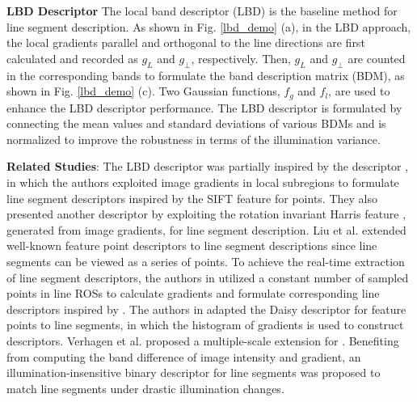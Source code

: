\documentclass[journal,compsoc]{IEEEtran}
\begin{document}
\textbf{LBD Descriptor} The local band descriptor (LBD) \cite{LBD} is the baseline method for line segment description. As shown in Fig. \ref{lbd_demo} (a), in the LBD \cite{LBD} approach, the local gradients parallel and orthogonal to the line directions are first calculated and recorded as $g_L$ and $g_\bot$, respectively. Then, $g_L$ and $g_\bot$ are counted in the corresponding bands to formulate the band description matrix (BDM), as shown in Fig. \ref{lbd_demo} (c). Two Gaussian functions, $f_g$ and $f_l$, are used to enhance the LBD descriptor performance. The LBD descriptor is formulated by connecting the mean values and standard deviations of various BDMs and is normalized to improve the robustness in terms of the illumination variance.

\textbf{Related Studies}:
The LBD descriptor was partially inspired by the descriptor \cite{MSLD}, in which the authors exploited image gradients in local subregions to formulate line segment descriptors inspired by the SIFT \cite{SIFT} feature for points. They also presented another descriptor by exploiting the rotation invariant Harris feature \cite{HLD}, generated from image gradients, for line segment description. Liu et al. extended well-known feature point descriptors to line segment descriptions \cite{Extendpointdescriptorsforlinecurveandregionmatching} since line segments can be viewed as a series of points. To achieve the real-time extraction of line segment descriptors, the authors in \cite{FastLineDescriptionforLinebasedSLAM} utilized a constant number of sampled points in line ROSs to calculate gradients and formulate corresponding line descriptors inspired by \cite{MSLD}. The authors in \cite{Matchingofstraightlinesegmentsfromaerialstereoimagesofurbanareas} adapted the Daisy descriptor \cite{DAISY} for feature points to line segments, in which the histogram of gradients is used to construct descriptors. Verhagen et al. proposed a multiple-scale extension for \cite{MSLD}. Benefiting from computing the band difference of image intensity and gradient, an illumination-insensitive binary descriptor \cite{IILB} for line segments was proposed to match line segments under drastic illumination changes.
\end{document}
